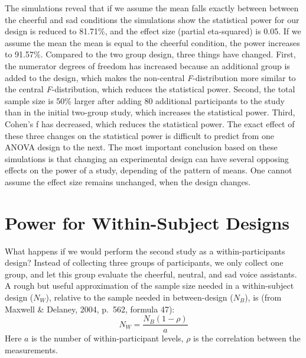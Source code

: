 \documentclass[,jou, draftfirst, a4paper,floatsintext]{apa6}
\begin{document}
The simulations reveal that if we assume the mean falls exactly between between the cheerful and sad conditions the simulations show the statistical power for our design is reduced to 81.71\%, and the effect size (partial eta-squared) is 0.05.
If we assume the mean the mean is equal to the cheerful condition, the power increases to 91.57\%.
Compared to the two group design, three things have changed.
First, the numerator degrees of freedom has increased because an additional group is added to the design, which makes the non-central \emph{F}-distribution more similar to the central \emph{F}-distribution, which reduces the statistical power.
Second, the total sample size is 50\% larger after adding 80 additional participants to the study than in the initial two-group study, which increases the statistical power.
Third, Cohen's f has decreased, which reduces the statistical power.
The exact effect of these three changes on the statistical power is difficult to predict from one ANOVA design to the next.
The most important conclusion based on these simulations is that changing an experimental design can have several opposing effects on the power of a study, depending of the pattern of means.
One cannot assume the effect size remains unchanged, when the design changes.

\hypertarget{power-for-within-subject-designs}{%
\section{Power for Within-Subject Designs}\label{power-for-within-subject-designs}}

What happens if we would perform the second study as a within-participants design?
Instead of collecting three groups of participants, we only collect one group, and let this group evaluate the cheerful, neutral, and sad voice assistants.
A rough but useful approximation of the sample size needed in a within-subject design (\(N_W\)), relative to the sample needed in between-design (\(N_B\)), is (from Maxwell \& Delaney, 2004, p.~562, formula 47):
\begin{equation}
N_{W}=\frac{N_{B}(1-\rho)}{a} \label{eq:within-n}
\end{equation}
Here \(a\) is the number of within-participant levels, \(\rho\) is the correlation between the measurements.
\end{document}
